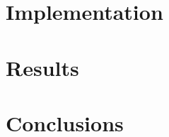 \documentclass[a4paper]{report}
\begin{document}
\listofalgorithms

\listoftables
{}









\chapter{Implementation}
\label{ch:implementation}

\chapter{Results}
\label{ch:results}

\chapter{Conclusions}
\label{ch:conclusions}



\nocite{*}
\printbibliography


\end{document}
